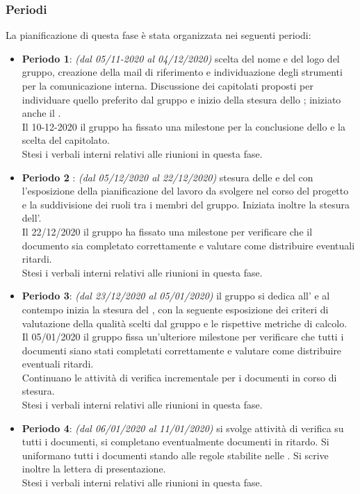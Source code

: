 \subsubsection{Periodi}
La pianificazione di questa fase è stata organizzata nei seguenti periodi:
\begin{itemize}
\item \textbf{Periodo 1}: \textit{(dal 05/11-2020 al 04/12/2020)} scelta del nome e del logo del gruppo, creazione della mail di riferimento e individuazione degli strumenti per la comunicazione interna. Discussione dei capitolati proposti per individuare quello preferito dal gruppo e inizio della stesura dello \textit{\SdF{}} ; iniziato anche il \Glossario. \\Il 10-12-2020 il gruppo ha fissato una milestone\glo{} per la conclusione dello \textit{\SdF{}} e la scelta del capitolato.\\Stesi i verbali interni relativi alle riunioni in questa fase.
\item \textbf{Periodo 2 }: \textit{(dal 05/12/2020 al 22/12/2020)} stesura delle \textit{\NdP{}} e del \textit{\PdP{}} con l'esposizione della pianificazione del lavoro da svolgere nel corso del progetto e la suddivisione dei ruoli tra i membri del gruppo. Iniziata inoltre la stesura dell'\textit{\AdR{}}.\\Il 22/12/2020 il gruppo ha fissato una milestone per verificare che il documento \textit{\NdP{}} sia completato correttamente e valutare come distribuire eventuali ritardi.\\Stesi i verbali interni relativi alle riunioni in questa fase.
\item \textbf{Periodo 3}: \textit{(dal 23/12/2020 al 05/01/2020)} il gruppo si dedica all'\textit{\AdR{}} e al contempo inizia la stesura del \textit{\PdQ{}}, con la seguente esposizione dei criteri di valutazione della qualità scelti dal gruppo e le rispettive metriche\glo{} di calcolo.\\Il 05/01/2020 il gruppo fissa un'ulteriore milestone per verificare che tutti i documenti siano stati completati correttamente e valutare come distribuire eventuali ritardi.\\Continuano le attività di verifica incrementale per i documenti in corso di stesura.\\Stesi i verbali interni relativi alle riunioni in questa fase.
\item \textbf{Periodo 4}: \textit{(dal 06/01/2020 al 11/01/2020)} si svolge attività di verifica su tutti i documenti, si completano eventualmente documenti in ritardo. Si uniformano tutti i documenti stando alle regole stabilite nelle \textit{\NdP{}}. Si scrive inoltre la lettera di presentazione.\\Stesi i verbali interni relativi alle riunioni in questa fase.
\end{itemize}

